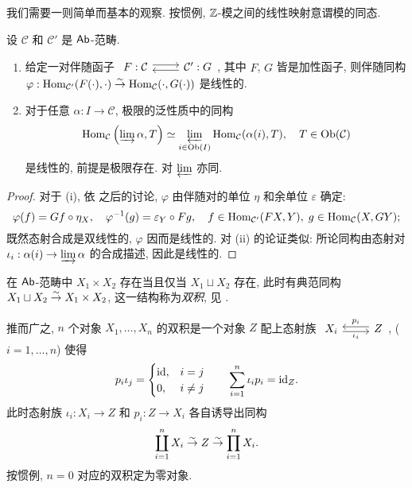 我们需要一则简单而基本的观察. 按惯例, $\mathbb{Z}$-模之间的线性映射意谓模的同态.

\begin{proposition}\label{prop:automatic-Ab-morphism}
	设 $\mathcal{C}$ 和 $\mathcal{C}'$ 是 $\mathsf{Ab}$-范畴.
	\begin{enumerate}
		\item 给定一对伴随函子
		$\begin{tikzcd}
			F: \mathcal{C} \arrow[shift left, r] & \mathcal{C}' \arrow[shift left, l] : G
		\end{tikzcd}$,
		其中 $F$, $G$ 皆是加性函子, 则伴随同构 $\varphi: \operatorname{Hom}_{\mathcal{C}'}(F(\cdot), \cdot) \stackrel{\sim}{\rightarrow} \operatorname{Hom}_{\mathcal{C}}(\cdot, G(\cdot))$ 是线性的.
		\item 对于任意 $\alpha: I \to \mathcal{C}$, 极限的泛性质中的同构
		\[ \operatorname{Hom}_{\mathcal{C}}\left( \varinjlim \alpha, T \right) \simeq \varprojlim_{i \in \operatorname{Ob}(I)} \operatorname{Hom}_{\mathcal{C}}(\alpha(i), T), \quad T \in \operatorname{Ob}(\mathcal{C}) \]
		是线性的, 前提是极限存在. 对 $\varprojlim$ 亦同.
	\end{enumerate}
\end{proposition}
\begin{proof}
	对于 (i), 依 \cite[定义 2.6.3]{Li1} 之后的讨论, $\varphi$ 由伴随对的单位 $\eta$ 和余单位 $\varepsilon$ 确定:
	\[ \varphi(f) = Gf \circ \eta_X, \quad \varphi^{-1}(g) = \varepsilon_Y \circ Fg, \quad f \in \operatorname{Hom}_{\mathcal{C}'}(FX, Y), \; g \in \operatorname{Hom}_{\mathcal{C}}(X, GY); \]
	既然态射合成是双线性的, $\varphi$ 因而是线性的. 对 (ii) 的论证类似: 所论同构由态射对 $\iota_i: \alpha(i) \to \varinjlim \alpha$ 的合成描述, 因此是线性的.
\end{proof}

在 $\mathsf{Ab}$-范畴中 $X_1 \times X_2$ 存在当且仅当 $X_1 \sqcup X_2$ 存在, 此时有典范同构 $X_1 \sqcup X_2 \stackrel{\sim}{\rightarrow} X_1 \times X_2$, 这一结构称为\emph{双积}, 见 \cite[定义 3.4.8, 定理 3.4.9]{Li1}.

推而广之, $n$ 个对象 $X_1, \ldots, X_n$ 的双积是一个对象 $Z$ 配上态射族
$\begin{tikzcd} X_i \arrow[r, yshift=-0.5ex, "\iota_i"'] & Z \arrow[l, yshift=0.5ex, "p_i"'] \end{tikzcd}$, ($i = 1, \ldots, n$) 使得
\begin{equation}\label{eqn:biproduct-identities}\begin{gathered}
	p_i \iota_j = \begin{cases} \mathrm{id}, & i=j \\ 0, & i \neq j \end{cases} \qquad
	\sum_{i=1}^n \iota_i p_i = \mathrm{id}_{Z}.
\end{gathered}\end{equation}
此时态射族 $\iota_i: X_i \to Z$ 和 $p_i: Z \to X_i$ 各自诱导出同构
\[ \coprod_{i=1}^n X_i \stackrel{\sim}{\rightarrow} Z \stackrel{\sim}{\rightarrow} \prod_{i=1}^n X_i. \]
按惯例, $n=0$ 对应的双积定为零对象.


